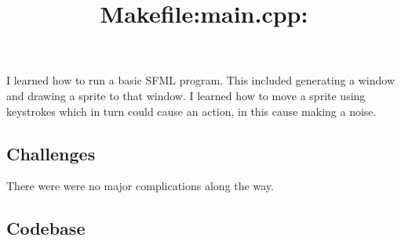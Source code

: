 I learned how to run a basic SFML program.
This included generating a window and drawing a sprite to that window.
I learned how to move a sprite using keystrokes which in turn could cause an action, in this cause making a noise.

\subsection{Challenges}\label{sec:ps0:challenges} %

There were were no major complications along the way.

\newpage
\subsection{Codebase}\label{sec:ps0:code} %

\bigskip
\title{\large Makefile:}

\bigskip
\title{\large main.cpp:}
